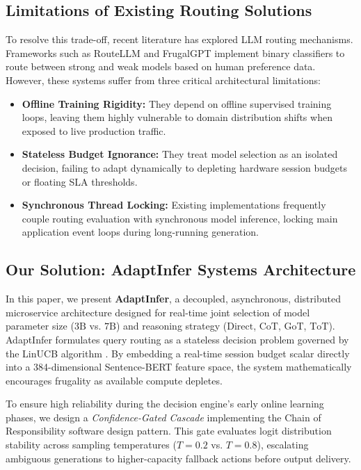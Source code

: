 \documentclass[pdflatex,sn-mathphys-num]{sn-jnl}%
\theoremstyle{thmstyleone}%
\theoremstyle{thmstyletwo}%
\theoremstyle{thmstylethree}%
\begin{document}
\subsection{Limitations of Existing Routing Solutions}
To resolve this trade-off, recent literature has explored LLM routing mechanisms. Frameworks such as RouteLLM \cite{ong2025routellm} and FrugalGPT \cite{chen2023frugalgpt} implement binary classifiers to route between strong and weak models based on human preference data. However, these systems suffer from three critical architectural limitations:
\begin{itemize}
    \item \textbf{Offline Training Rigidity:} They depend on offline supervised training loops, leaving them highly vulnerable to domain distribution shifts when exposed to live production traffic.
    \item \textbf{Stateless Budget Ignorance:} They treat model selection as an isolated decision, failing to adapt dynamically to depleting hardware session budgets or floating SLA thresholds.
    \item \textbf{Synchronous Thread Locking:} Existing implementations frequently couple routing evaluation with synchronous model inference, locking main application event loops during long-running generation.
\end{itemize}

\subsection{Our Solution: AdaptInfer Systems Architecture}
In this paper, we present \textbf{AdaptInfer}, a decoupled, asynchronous, distributed microservice architecture designed for real-time joint selection of model parameter size ($3\text{B}$ vs. $7\text{B}$) and reasoning strategy ($\text{Direct}$, $\text{CoT}$, $\text{GoT}$, $\text{ToT}$). AdaptInfer formulates query routing as a stateless decision problem governed by the LinUCB algorithm \cite{li2010contextual}. By embedding a real-time session budget scalar directly into a 384-dimensional Sentence-BERT feature space, the system mathematically encourages frugality as available compute depletes. 

To ensure high reliability during the decision engine's early online learning phases, we design a \textit{Confidence-Gated Cascade} implementing the Chain of Responsibility software design pattern. This gate evaluates logit distribution stability across sampling temperatures ($T=0.2$ vs. $T=0.8$), escalating ambiguous generations to higher-capacity fallback actions before output delivery.
\end{document}
